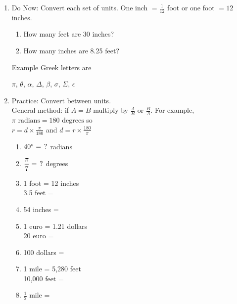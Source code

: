 \begin{enumerate}
\newpage
\item Do Now: Convert each set of units. One inch $= \displaystyle \frac{1}{12}$ foot or one foot $= 12$ inches.
  \begin{enumerate}[itemsep=1.5cm]
    \item How many feet are 30 inches?
    \item How many inches are 8.25 feet?
  \end{enumerate}

Example Greek letters are 
{\Large$\pi$, $\theta$, $\alpha$, $\Delta$, $\beta$, $\sigma$, $\Sigma$, $\epsilon$ \par}

\item Practice: Convert between units. \\[0.25cm]
General method: if $A = B$ multiply by $\displaystyle \frac{A}{B} \text{ or } \frac{B}{A}$. For example, $\pi \text{ radians}= 180 \text{ degrees}$ so \\
$\displaystyle r = d \times \frac{\pi}{180}$ and 
$\displaystyle d = r \times \frac{180}{\pi}$
\vspace{0.5cm}
  \begin{multicols}{2}
  \raggedcolumns
  \begin{enumerate}[itemsep=1.5cm]
    \item $40^\circ = \hspace{0.15cm} ?$ radians
    \item $\displaystyle \frac{\pi}{7}  = \hspace{0.15cm} ?$ degrees
    \item 1 foot = 12 inches\\[0.5cm]
    3.5 feet = 
    \item 54 inches = 
    \item 1 euro = 1.21 dollars\\[0.5cm]
    20 euro = 
    \item 100 dollars = 
    \item 1 mile = 5,280 feet\\[0.5cm]
    10,000 feet = 
    \item $\frac{1}{2}$ mile =   
  \end{enumerate}
  \end{multicols}



\end{enumerate}
